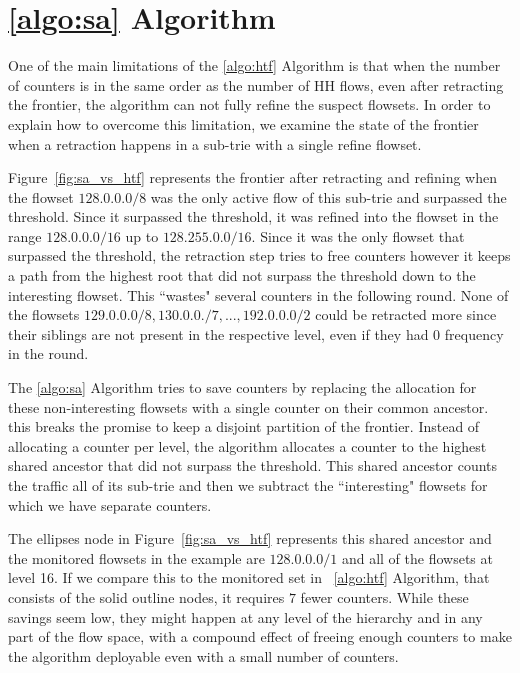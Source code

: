\section{\ref{algo:sa} Algorithm}

One of the main limitations of the \ref{algo:htf} Algorithm is that when the number of counters is in the same order as the number of HH flows, even after retracting the frontier, the algorithm can not fully refine the suspect flowsets. In order to explain how to overcome this limitation, we examine the state of the frontier when a retraction happens in a sub-trie with a single refine flowset.

Figure~\ref{fig:sa_vs_htf} represents the frontier after retracting and refining when the flowset $128.0.0.0/8$ was the only active flow of this sub-trie and surpassed the threshold. Since it surpassed the threshold, it was refined into the flowset in the range $128.0.0.0/16$ up to $128.255.0.0/16$. Since it was the only flowset that surpassed the threshold, the retraction step tries to free counters however it keeps a path from the highest root that did not surpass the threshold down to the interesting flowset. This ``wastes" several counters in the following round. None of the flowsets $129.0.0.0/8, 130.0.0./7, ..., 192.0.0.0/2$ could be retracted more since their siblings are not present in the respective level, even if they had 0 frequency in the round.

The \ref{algo:sa} Algorithm tries to save counters by replacing the allocation for these non-interesting flowsets with a single counter on their common ancestor. this breaks the promise to keep a disjoint partition of the frontier. Instead of allocating a counter per level, the algorithm allocates a counter to the highest shared ancestor that did not surpass the threshold. This shared ancestor counts the traffic all of its sub-trie and then we subtract the ``interesting" flowsets for which we have separate counters.

The ellipses node in Figure~\ref{fig:sa_vs_htf} represents this shared ancestor and the monitored flowsets in the example are $128.0.0.0/1$ and all of the flowsets at level 16. If we compare this to the monitored set in ~\ref{algo:htf} Algorithm, that consists of the solid outline nodes, it requires $7$ fewer counters. While these savings seem low, they might happen at any level of the hierarchy and in any part of the flow space, with a compound effect of freeing enough counters to make the algorithm deployable even with a small number of counters.

